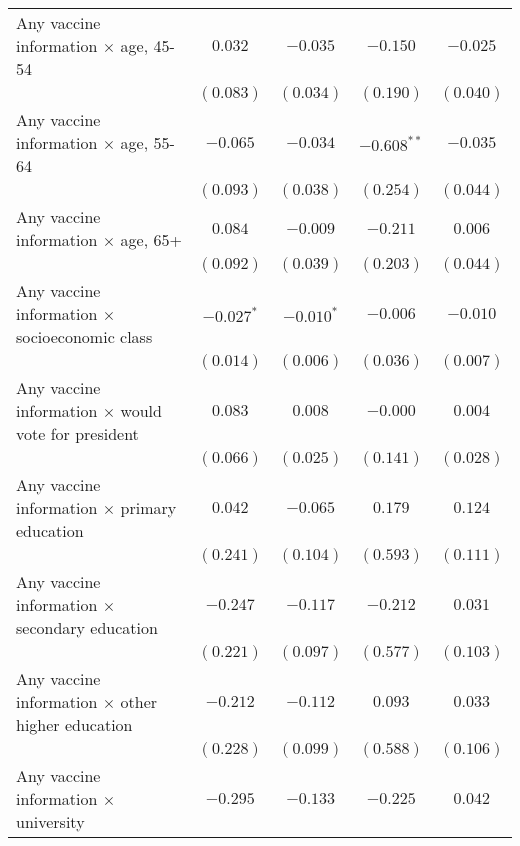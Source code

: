 \begin{table}
\begin{center}
\begin{tabular}{l c c c c}
Any vaccine information $\times$ age, 45-54               & $0.032$      & $-0.035$     & $-0.150$      & $-0.025$  \\
                                                          & $(0.083)$    & $(0.034)$    & $(0.190)$     & $(0.040)$ \\
Any vaccine information $\times$ age, 55-64               & $-0.065$     & $-0.034$     & $-0.608^{**}$ & $-0.035$  \\
                                                          & $(0.093)$    & $(0.038)$    & $(0.254)$     & $(0.044)$ \\
Any vaccine information $\times$ age, 65+                 & $0.084$      & $-0.009$     & $-0.211$      & $0.006$   \\
                                                          & $(0.092)$    & $(0.039)$    & $(0.203)$     & $(0.044)$ \\
Any vaccine information $\times$ socioeconomic class      & $-0.027^{*}$ & $-0.010^{*}$ & $-0.006$      & $-0.010$  \\
                                                          & $(0.014)$    & $(0.006)$    & $(0.036)$     & $(0.007)$ \\
Any vaccine information $\times$ would vote for president & $0.083$      & $0.008$      & $-0.000$      & $0.004$   \\
                                                          & $(0.066)$    & $(0.025)$    & $(0.141)$     & $(0.028)$ \\
Any vaccine information $\times$ primary education        & $0.042$      & $-0.065$     & $0.179$       & $0.124$   \\
                                                          & $(0.241)$    & $(0.104)$    & $(0.593)$     & $(0.111)$ \\
Any vaccine information $\times$ secondary education      & $-0.247$     & $-0.117$     & $-0.212$      & $0.031$   \\
                                                          & $(0.221)$    & $(0.097)$    & $(0.577)$     & $(0.103)$ \\
Any vaccine information $\times$ other higher education   & $-0.212$     & $-0.112$     & $0.093$       & $0.033$   \\
                                                          & $(0.228)$    & $(0.099)$    & $(0.588)$     & $(0.106)$ \\
Any vaccine information $\times$ university               & $-0.295$     & $-0.133$     & $-0.225$      & $0.042$   \\

\end{tabular}
\end{center}
\end{table}
